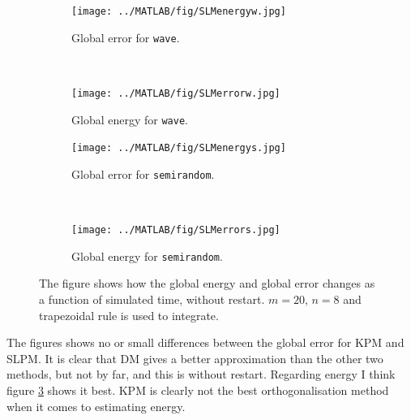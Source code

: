 \begin{figure}[H]
        \centering
        \begin{subfigure}[b]{0.45\textwidth}
                \texttt{[image: ../MATLAB/fig/SLMenergyw.jpg]}
                \caption{Global error for \texttt{wave}.}
                \label{fig:SLMenergyw}
        \end{subfigure}
        ~
        \begin{subfigure}[b]{0.45\textwidth}
                \texttt{[image: ../MATLAB/fig/SLMerrorw.jpg]}
                \caption{Global energy for \texttt{wave}. }
                \label{fig:SLMerrorw}
        \end{subfigure}
        
        \begin{subfigure}[b]{0.45\textwidth}
                \texttt{[image: ../MATLAB/fig/SLMenergys.jpg]}
                \caption{Global error for \texttt{semirandom}.}
                \label{fig:SLMenergys}
        \end{subfigure}
		~
        \begin{subfigure}[b]{0.45\textwidth}
                \texttt{[image: ../MATLAB/fig/SLMerrors.jpg]}
                \caption{Global energy for \texttt{semirandom}.}
                \label{fig:SLMerrors}
        \end{subfigure}
        \caption{ The figure shows how the global energy and global error changes as a function of simulated time, without restart. $m = 20$, $n = 8$ and trapezoidal rule is used to integrate.}
        \label{fig:SLMenergyerror}
\end{figure}
The figures shows no or small differences between the global error for KPM and SLPM. It is clear that DM gives a better approximation than the other two methods, but not by far, and this is without restart. Regarding energy I think figure \ref{fig:SLMenergys} shows it best. KPM is clearly not the best orthogonalisation method when it comes to estimating energy. 

